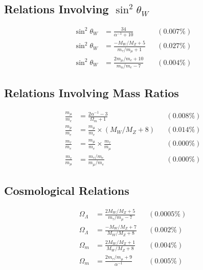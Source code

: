 \documentclass[11pt,a4paper]{article}
\begin{document}
\subsection{Relations Involving $\sin^2\theta_W$}

\begin{align}
\sin^2\theta_W &= \frac{34}{\alpha^{-1} + 10} &&(0.007\%) \\
\sin^2\theta_W &= \frac{-M_W/M_Z + 5}{m_\tau/m_\mu + 1} &&(0.027\%) \\
\sin^2\theta_W &= \frac{2m_\mu/m_e + 10}{m_n/m_e - 7} &&(0.004\%)
\end{align}

\subsection{Relations Involving Mass Ratios}

\begin{align}
\frac{m_\mu}{m_e} &= \frac{2\alpha^{-1} - 3}{\Omega_m + 1} &&(0.008\%) \\
\frac{m_p}{m_e} &= \frac{m_\mu}{m_e} \times (M_W/M_Z + 8) &&(0.014\%) \\
\frac{m_\tau}{m_e} &= \frac{m_\mu}{m_e} \times \frac{m_\tau}{m_\mu} &&(0.000\%) \\
\frac{m_\tau}{m_\mu} &= \frac{m_\tau/m_e}{m_\mu/m_e} &&(0.000\%)
\end{align}

\subsection{Cosmological Relations}

\begin{align}
\Omega_\Lambda &= \frac{2M_W/M_Z + 5}{m_\tau/m_\mu - 7} &&(0.0005\%) \\
\Omega_\Lambda &= \frac{-M_W/M_Z + 7}{M_W/M_Z + 8} &&(0.002\%) \\
\Omega_m &= \frac{2M_W/M_Z + 1}{M_W/M_Z + 8} &&(0.004\%) \\
\Omega_m &= \frac{2m_\tau/m_\mu + 9}{\alpha^{-1}} &&(0.005\%)
\end{align}
\end{document}
